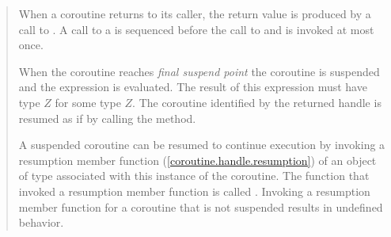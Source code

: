 \begin{quote}


\pnum 
When a coroutine returns to its caller, the return value is produced by a call to \linebreak
 \mbox{}. A call to a  is sequenced before the call to \linebreak
\mbox{} and is invoked at most once.

\pnum
When the coroutine reaches \textit{final suspend point} the coroutine is suspended and the expression \linebreak
{} is evaluated.
The result of this expression must have type $Z$\tcode{>} for some type $Z$.
The coroutine identified by the returned handle is resumed as if by calling the  method. 


\pnum
A suspended coroutine can be resumed
to continue execution by invoking
a resumption member function (\ref{coroutine.handle.resumption}) of an object of type  
associated with this instance of the coroutine. The function that invoked a resumption member function is called . Invoking a resumption member function for a coroutine that is not suspended results in undefined behavior. 


\end{quote}
